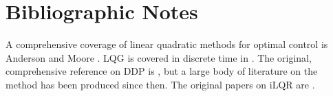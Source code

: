 \section{Bibliographic Notes}

A comprehensive coverage of linear quadratic methods for optimal control is Anderson and Moore \cite{anderson2007optimal}. LQG is covered in discrete time in \cite{bertsekas1995dynamic}. The original, comprehensive reference on DDP is \cite{mayne1970ddp}, but a large body of literature on the method has been produced since then. The original papers on iLQR are \cite{todorov2005generalized,li2004iterative}.


